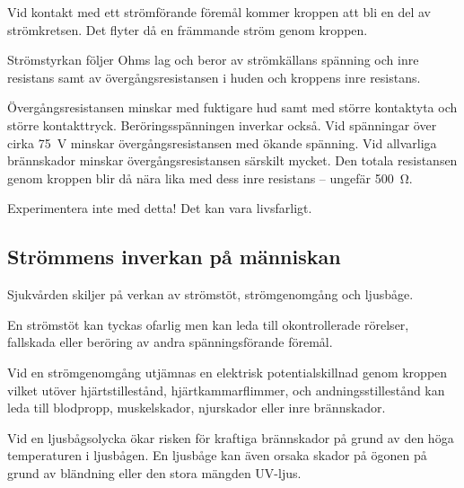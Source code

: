 Vid kontakt med ett strömförande föremål kommer kroppen att bli en del av
strömkretsen.
Det flyter då en främmande ström genom kroppen.

Strömstyrkan följer Ohms lag och beror av strömkällans spänning och inre
resistans samt av övergångsresistansen i huden och kroppens inre resistans.

Övergångsresistansen minskar med fuktigare hud samt med större kontaktyta och
större kontakttryck.
Beröringsspänningen inverkar också.
Vid spänningar över cirka \qty{75}{\volt} minskar övergångsresistansen med
ökande spänning.
Vid allvarliga brännskador minskar övergångsresistansen särskilt mycket.
Den totala resistansen genom kroppen blir då nära lika med dess inre resistans
-- ungefär \qty{500}{\ohm}.

\begin{center}
\begin{minipage}{0.19\columnwidth}
\Huge{\selectfont{}\relax}
\end{minipage}
\begin{minipage}{0.7\columnwidth}
  Experimentera inte med detta! Det kan vara livsfarligt.
\end{minipage}
\end{center}


\subsection{Strömmens inverkan på människan}

Sjukvården skiljer på verkan av strömstöt, strömgenomgång och ljusbåge.

En strömstöt kan tyckas ofarlig men kan leda till okontrollerade rörelser,
fallskada eller beröring av andra spänningsförande föremål.

Vid en strömgenomgång utjämnas en elektrisk potentialskillnad genom kroppen
vilket utöver hjärtstillestånd, hjärtkammarflimmer, och andningsstillestånd
kan leda till blodpropp, muskelskador, njurskador eller inre brännskador.

Vid en ljusbågsolycka ökar risken för kraftiga brännskador på grund av den
höga temperaturen i ljusbågen.
En ljusbåge kan även orsaka skador på ögonen på grund av bländning eller den
stora mängden UV-ljus.

